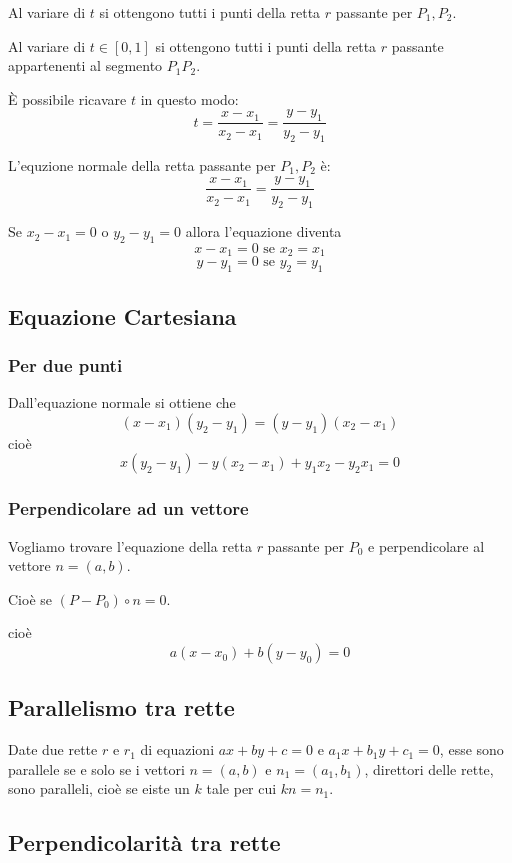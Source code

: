 Al variare di $t$ si ottengono tutti i punti della retta $r$ passante per $P_1,P_2$.

Al variare di $t \in [0,1]$ si ottengono tutti i punti della retta $r$ passante appartenenti al segmento $P_1P_2$.

È possibile ricavare $t$ in questo modo:
$$ t = \frac{x-x_1}{x_2-x_1} = \frac{y-y_1}{y_2-y_1}$$


\begin{definition}
L'equzione normale della retta passante per $P_1,P_2$ è: $$\frac{x-x_1}{x_2-x_1} = \frac{y-y_1}{y_2-y_1}$$
\end{definition}

Se $x_2 - x_1=0$ o $y_2 - y_1=0$ allora l'equazione diventa
$$x-x_1 = 0 \text{ se } x_2 = x_1$$
$$y-y_1 = 0 \text{ se } y_2 = y_1$$

\subsection{Equazione Cartesiana}

\subsubsection{Per due punti}

Dall'equazione normale si ottiene che
$$(x-x_1)(y_2-y_1) = (y-y_1)(x_2-x_1)$$
cioè
$$x(y_2-y_1)-y(x_2-x_1)+y_1x_2-y_2x_1=0$$


\subsubsection{Perpendicolare ad un vettore}

Vogliamo trovare l'equazione della retta $r$ passante per $P_0$ e perpendicolare al vettore $n=(a,b)$.

Cioè se $(P-P_0) \circ n = 0$.

cioè $$a(x-x_0)+b(y-y_0) = 0$$

\subsection{Parallelismo tra rette}

Date due rette $r$ e $r_1$ di equazioni $ax+by+c=0$ e $a_1x+b_1y+c_1=0$, esse sono parallele se e solo se i vettori $n  = (a,b)$ e $n_1 = (a_1,b_1)$, direttori delle rette, sono paralleli, cioè se eiste un $k$ tale per cui $kn = n_1$.


\subsection{Perpendicolarità tra rette}

